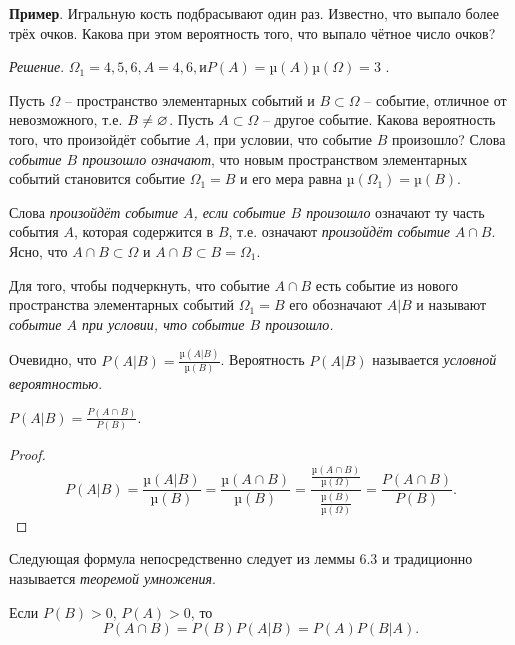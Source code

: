 \textbf{Пример}. Игральную кость подбрасывают один раз. Известно, что выпало более трёх очков. Какова при этом вероятность того, что выпало чётное число очков?

\textit{Решение}. $\Omega_1 = {4, 5, 6}, A = {4, 6}, и P(A) = µ(A)
µ(\Omega) = 3$ .

\begin{zam}
Пусть $\Omega$ -- пространство элементарных событий и $B \subset \Omega$ -- событие, отличное от невозможного, т.е. $B \ne \varnothing$. 
Пусть $A \subset \Omega$ – другое событие. Какова вероятность того, что произойдёт событие $A$, при условии,
что событие $B$ произошло? Слова \textit{событие $B$ произошло означают}, что новым пространством элементарных событий становится событие $\Omega_1 = B$ и его мера равна $µ(\Omega_1 ) = µ(B)$. 

Слова \textit{произойдёт событие $A$, если событие $B$
произошло} означают ту часть события $A$, которая содержится в $B$, т.е. означают \textit{произойдёт событие} $A \cap B$. Ясно, что $A \cap B \subset \Omega$ и $A \cap B \subset B = \Omega_1$.
\end{zam}

\begin{definition}
Для того, чтобы подчеркнуть, что событие $A \cap B$ есть
событие из нового пространства элементарных событий $\Omega_1 = B$ его обозначают $A|B$ и называют \textit{событие $A$ при условии, что событие $B$ произошло.}

Очевидно, что $P(A|B)=\frac{µ(A|B)}{µ(B)}$. Вероятность $P(A|B)$ называется \textit{условной вероятностью}.
\end{definition}

\begin{lemma}
	$P(A|B) = \frac{P(A\cap B)}{P(B)}$.
\end{lemma}

\begin{proof}
\begin{equation*}
	P(A|B) = \frac{µ(A|B)}{µ(B)}=\frac{µ(A\cap B)}{µ(B)}
=\frac{\frac{µ(A\cap B)}{µ(\Omega)}}{\frac{µ(B)}{µ(\Omega)}}
=\frac{P(A\cap B)}{P(B)}.
\end{equation*}	
\end{proof}

Следующая формула непосредственно следует из леммы 6.3 и традиционно называется \textit{теоремой умножения}.

\begin{theorem}
Если $P(B) > 0$, $P(A) > 0$, то
\begin{equation*}
	P(A \cap B) = P(B)P(A|B) = P(A)P(B|A).
\end{equation*}
\end{theorem}

